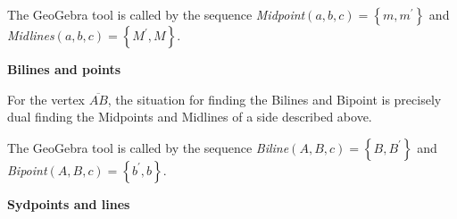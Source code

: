 \documentclass{unswthesis}
\begin{document}
The GeoGebra tool is called by the sequence \textit{Midpoint}$\left(
a,b,c\right) =\left\{ m,m^{\prime }\right\} $ and \textit{Midlines}$\left(
a,b,c\right) =\left\{ M^{\prime },M\right\} $.

\textbf{Bilines and points}

For the vertex $\overline{AB}$, the situation for finding the Bilines and
Bipoint is precisely dual finding the Midpoints and Midlines of a side
described above.

The GeoGebra tool is called by the sequence \textit{Biline}$\left(
A,B,c\right) =\left\{ B,B^{\prime }\right\} $ and \textit{Bipoint}$\left(
A,B,c\right) =\left\{ b^{\prime },b\right\} $.

\textbf{Sydpoints and lines}
\end{document}
